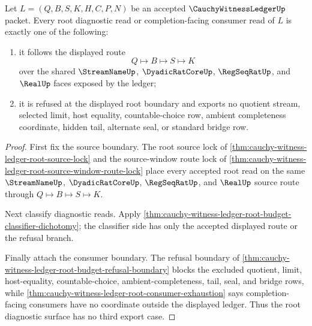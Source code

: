 \begin{theorem}
\label{thm:cauchy-witness-ledger-root-diagnostic-refusal-dichotomy}
Let $L=(Q,B,S,K,H,C,P,N)$ be an accepted $\CauchyWitnessLedgerUp$ packet. Every root diagnostic read or completion-facing consumer read of $L$ is exactly one of the following:
\begin{enumerate}
\item it follows the displayed route
$$
Q \longmapsto B \longmapsto S \longmapsto K
$$
over the shared $\StreamNameUp$, $\DyadicRatCoreUp$, $\RegSeqRatUp$, and $\RealUp$ faces exposed by the ledger;
\item it is refused at the displayed root boundary and exports no quotient stream, selected limit, host equality, countable-choice row, ambient completeness coordinate, hidden tail, alternate seal, or standard bridge row.
\end{enumerate}
\end{theorem}
\begin{proof}
First fix the source boundary. The root source lock of \autoref{thm:cauchy-witness-ledger-root-source-lock} and the source-window route lock of \autoref{thm:cauchy-witness-ledger-root-source-window-route-lock} place every accepted root read on the same $\StreamNameUp$, $\DyadicRatCoreUp$, $\RegSeqRatUp$, and $\RealUp$ source route through $Q \longmapsto B \longmapsto S \longmapsto K$.

Next classify diagnostic reads. Apply \autoref{thm:cauchy-witness-ledger-root-budget-classifier-dichotomy}; the classifier side has only the accepted displayed route or the refusal branch.

Finally attach the consumer boundary. The refusal boundary of \autoref{thm:cauchy-witness-ledger-root-budget-refusal-boundary} blocks the excluded quotient, limit, host-equality, countable-choice, ambient-completeness, tail, seal, and bridge rows, while \autoref{thm:cauchy-witness-ledger-root-consumer-exhaustion} says completion-facing consumers have no coordinate outside the displayed ledger. Thus the root diagnostic surface has no third export case.
\end{proof}

